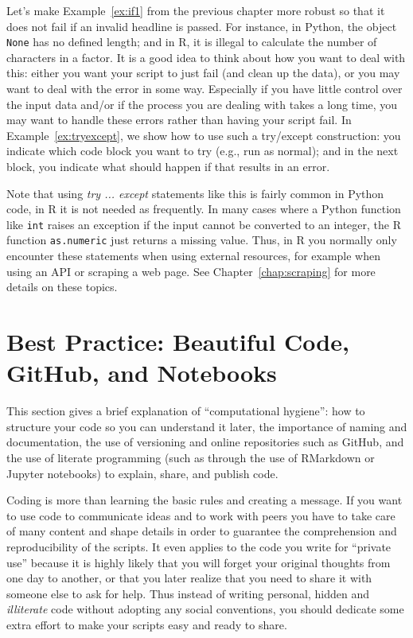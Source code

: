 Let's make Example~\ref{ex:if1} from the previous chapter more robust so that it does not fail if an invalid headline is passed. For instance, in Python, the object \verb|None| has no defined length; and in R, it is illegal to calculate the number of characters in a factor. It is a good idea to think about how you want to deal with this: either you want your script to just fail (and clean up the data), or you may want to deal with the error in some way. Especially if you have little control over the input data and/or if the process you are dealing with takes a long time, you may want to  handle these errors rather than having your script fail. In Example~\ref{ex:tryexcept}, we show how to use such a try/except construction: you indicate which code block you want to try (e.g., run as normal); and in the next block, you indicate what should happen if that results in an error.

Note that using \emph{try ... except} statements like this is fairly common in Python code,
in R it is not needed as frequently.
In many cases where a Python function like \verb|int| raises an exception
if the input cannot be converted to an integer, the R function \verb|as.numeric| just returns a missing value.
Thus, in R you normally only encounter these statements when using external resources,
for example when using an API or scraping a web page. See Chapter~\ref{chap:scraping} for more details on these topics.



%

\section{Best Practice: Beautiful Code, GitHub, and Notebooks}
\label{sec:practices}


This section gives a brief explanation of ``computational hygiene'': how to structure your code so you can understand it later, the importance of naming and documentation, the use of versioning and online repositories such as GitHub, and the use of literate programming (such as through the use of RMarkdown or Jupyter notebooks) to explain, share, and publish code.

Coding is more than learning the basic rules and creating a message. If you want to use code to communicate ideas and to work with peers you have to take care of many content and shape details in order to guarantee the comprehension and reproducibility of the scripts. It even applies to the code you write for ``private use'' because it is highly likely that you will  forget your original thoughts from one day to another, or that you later realize that you need to share it with someone else to ask for help. Thus instead of writing personal, hidden and \textit{illiterate} code without adopting any social conventions, you should dedicate some extra effort to make your scripts easy and ready to share.

